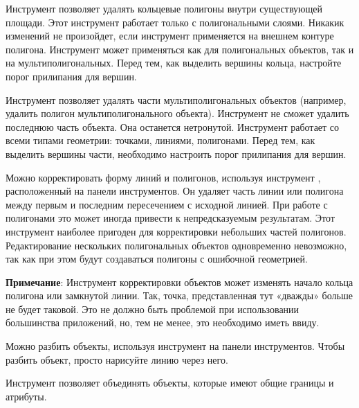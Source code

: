Инструмент  позволяет удалять
кольцевые полигоны внутри существующей площади. Этот инструмент работает
только с полигональными слоями. Никакик изменений не произойдет, если
инструмент применяется на внешнем контуре полигона. Инструмент может
применяться как для полигональных объектов, так и на мультиполигональных.
Перед тем, как выделить вершины кольца, настройте порог прилипания для вершин.



Инструмент  позволяет удалять
части мультиполигональных объектов (например, удалить полигон
мультиполигонального объекта). Инструмент не сможет удалить последнюю часть
объекта. Она останется нетронутой. Инструмент работает со всеми типами
геометрии: точками, линиями, полигонами. Перед тем, как выделить вершины
части, необходимо настроить порог прилипания для вершин.


Можно корректировать форму линий и полигонов, используя инструмент
, расположенный на
панели инструментов. Он удаляет часть линии или полигона между первым и
последним пересечением с исходной линией. При работе с полигонами это
может иногда привести к непредсказуемым результатам. Этот инструмент
наиболее пригоден для корректировки небольших частей полигонов. Редактирование
нескольких  полигональных объектов одновременно невозможно, так как при этом
будут создаваться полигоны с ошибочной геометрией.

\textbf{Примечание}: Инструмент корректировки объектов может изменять начало
кольца полигона или замкнутой линии. Так, точка, представленная тут «дважды»
больше не будет таковой. Это не должно быть проблемой при использовании
большинства приложений, но, тем не менее, это необходимо иметь ввиду.


Можно разбить объекты, используя инструмент
 на панели
инструментов. Чтобы разбить объект, просто нарисуйте линию через него.


Инструмент 
позволяет объединять объекты, которые имеют общие границы и атрибуты.

